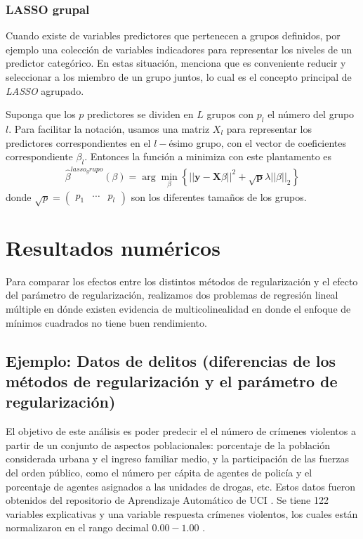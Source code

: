 \documentclass{article}
\newcommand{\X}{\mathbf{X}}
\newcommand{\y}{\mathbf{y}}
\newcommand{\p}{\mathbf{p}}
\begin{document}
\subsubsection{LASSO grupal}
Cuando existe de variables predictores que pertenecen a grupos definidos, por ejemplo una colección de variables indicadores para representar los niveles de un predictor categórico. En estas situación, \cite{statisticallearning} menciona que es conveniente reducir y seleccionar a los miembro de un grupo juntos, lo cual es el concepto principal de \textit{LASSO} agrupado.

Suponga que los $p$ predictores se dividen en $L$ grupos con $p_l$ el número del grupo $l$. Para facilitar la notación, usamos una matriz $X_l$ para representar los predictores correspondientes en el $l-$ésimo grupo, con el vector de coeficientes correspondiente $\beta_l.$ Entonces la función a minimiza con este plantamento es
\begin{align}
    \hat{\beta}^{lasso_grupo}(\beta) = \arg \min_{\beta} \left\{||\y- \X \beta||^2+\sqrt{\p}\lambda||\beta||_2 \right\}
\end{align}
donde $\sqrt{p}=\begin{pmatrix}p_1& \cdots & p_l \end{pmatrix}$ son los diferentes tamaños de los grupos.
\section{Resultados numéricos}
Para comparar los efectos entre los distintos métodos de regularización y el efecto del parámetro de regularización, realizamos dos problemas de regresión lineal múltiple en dónde existen evidencia de multicolinealidad en donde el enfoque de mínimos cuadrados no tiene buen rendimiento.

\subsection{Ejemplo: Datos de delitos (diferencias de los métodos de regularización y el parámetro de regularización)}
El objetivo de este análisis es poder predecir el el número de crímenes violentos a partir de un conjunto de aspectos poblacionales: porcentaje de la población considerada urbana y el ingreso familiar medio, y la participación de las fuerzas del orden público, como el número per cápita de agentes de policía y el porcentaje de agentes asignados a las unidades de drogas, etc. Estos datos fueron obtenidos del repositorio de Aprendizaje Automático de UCI \citep{datos_uic}. Se tiene 122 variables explicativas y una variable respuesta crímenes violentos, los cuales están normalizaron en el rango decimal $0.00-1.00$ \citep{linear_regression_with_r}. 
\end{document}
